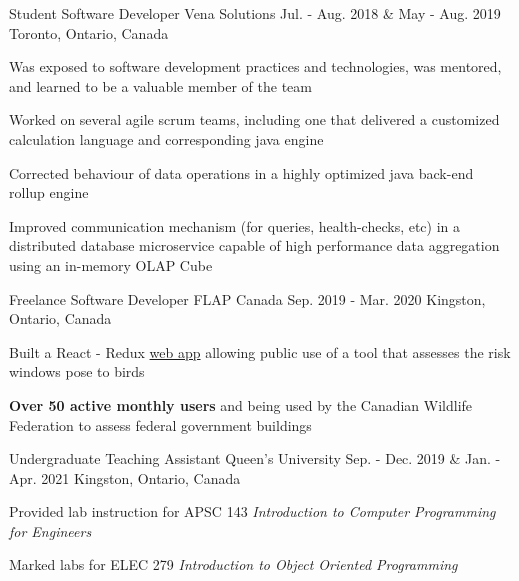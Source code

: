 \begin{cventries}
  \cventry
    {Student Software Developer} %
    {Vena Solutions} %
    {Jul. - Aug. 2018 \& May - Aug. 2019} %
    {Toronto, Ontario, Canada} %
    {
      \begin{cvitems} %
        \item{Was exposed to software development practices and technologies, was mentored, and learned to be a valuable member of the team}
        \item{Worked on several agile scrum teams, including one that delivered a customized calculation language and corresponding java engine}
        \item{Corrected behaviour of data operations in a highly optimized java back-end rollup engine} %
        \item{Improved communication mechanism (for queries, health-checks, etc) in a distributed database microservice capable of high performance data aggregation using an in-memory OLAP Cube}
      \end{cvitems}
    }

  \cventry
    {Freelance Software Developer} %
    {FLAP Canada} %
    {Sep. 2019 - Mar. 2020} %
    {Kingston, Ontario, Canada} %
    {
      \begin{cvitems} %
        \item {Built a React - Redux \href{https://www.flapapp.ca/}{web app} allowing public use of a tool that assesses the risk windows pose to birds}
        \item{\textbf{Over 50 active monthly users} and being used by the Canadian Wildlife Federation to assess federal government buildings}
      \end{cvitems}
    }

  \cventry
    {Undergraduate Teaching Assistant} %
    {Queen's University} %
    {Sep. - Dec. 2019 \& Jan. - Apr. 2021} %
    {Kingston, Ontario, Canada} %
    {
      \begin{cvitems} %
        \item{Provided lab instruction for APSC 143 \textit{Introduction to Computer Programming for Engineers}}
        \item{Marked labs for ELEC 279 \textit{Introduction to Object Oriented Programming}}
      \end{cvitems}
    }


\end{cventries}
